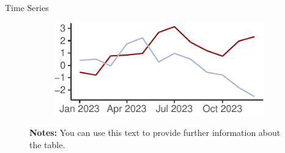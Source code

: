 \documentclass[11pt, aspectratio=169, t]{beamer}
\begin{document}
\begin{frame}{Time Series}
\protect\hypertarget{time-series}{}
\begin{figure}

\caption{\label{fig-ts1}Displaying how things evolve over time}

{\centering 

\begin{figure}[H]

{\centering \includegraphics{example_slides_files/figure-beamer/tsplot1-1.pdf}

}

\end{figure}

\hypertarget{fig-ts1-1}{}
\vspace{-5pt}
\begin{minipage}{0.9\textwidth}
\scriptsize
\singlespacing
\textbf{Notes:} You can use this text to provide further information about the table. \lipsum[66]
\end{minipage}
\vspace{15pt}

}

\end{figure}
\end{frame}
\end{document}
